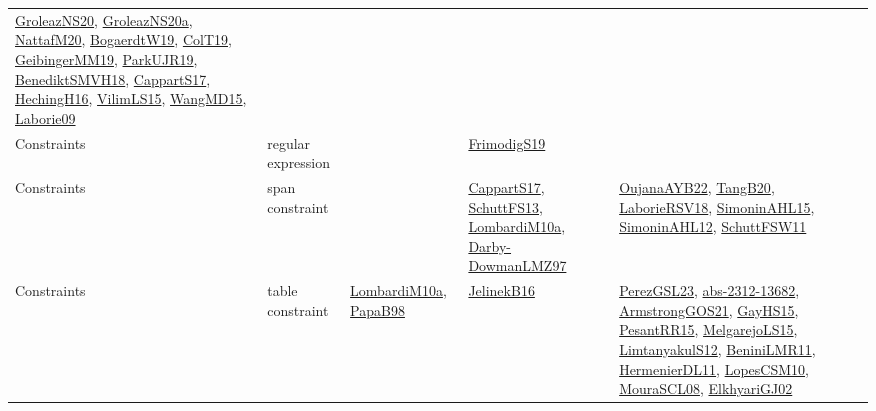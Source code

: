 {\begin{longtable}{lp{3cm}>{\raggedright}p{6cm}>{\raggedright}p{6cm}p{8cm}}
\href{papers/GroleazNS20.pdf}{GroleazNS20}\cite{GroleazNS20}, \href{papers/GroleazNS20a.pdf}{GroleazNS20a}\cite{GroleazNS20a}, \href{papers/NattafM20.pdf}{NattafM20}\cite{NattafM20}, \href{papers/BogaerdtW19.pdf}{BogaerdtW19}\cite{BogaerdtW19}, \href{papers/ColT19.pdf}{ColT19}\cite{ColT19}, \href{papers/GeibingerMM19.pdf}{GeibingerMM19}\cite{GeibingerMM19}, \href{papers/ParkUJR19.pdf}{ParkUJR19}\cite{ParkUJR19}, \href{papers/BenediktSMVH18.pdf}{BenediktSMVH18}\cite{BenediktSMVH18}, \href{papers/CappartS17.pdf}{CappartS17}\cite{CappartS17}, \href{papers/HechingH16.pdf}{HechingH16}\cite{HechingH16}, \href{papers/VilimLS15.pdf}{VilimLS15}\cite{VilimLS15}, \href{articles/WangMD15.pdf}{WangMD15}\cite{WangMD15}, \href{papers/Laborie09.pdf}{Laborie09}\cite{Laborie09}\\
Constraints & regular expression &  & \href{papers/FrimodigS19.pdf}{FrimodigS19}\cite{FrimodigS19} & \\
Constraints & span constraint &  & \href{papers/CappartS17.pdf}{CappartS17}\cite{CappartS17}, \href{papers/SchuttFS13.pdf}{SchuttFS13}\cite{SchuttFS13}, \href{articles/LombardiM10a.pdf}{LombardiM10a}\cite{LombardiM10a}, \href{articles/Darby-DowmanLMZ97.pdf}{Darby-DowmanLMZ97}\cite{Darby-DowmanLMZ97} & \href{papers/OujanaAYB22.pdf}{OujanaAYB22}\cite{OujanaAYB22}, \href{papers/TangB20.pdf}{TangB20}\cite{TangB20}, \href{articles/LaborieRSV18.pdf}{LaborieRSV18}\cite{LaborieRSV18}, \href{articles/SimoninAHL15.pdf}{SimoninAHL15}\cite{SimoninAHL15}, \href{papers/SimoninAHL12.pdf}{SimoninAHL12}\cite{SimoninAHL12}, \href{articles/SchuttFSW11.pdf}{SchuttFSW11}\cite{SchuttFSW11}\\
Constraints & table constraint & \href{articles/LombardiM10a.pdf}{LombardiM10a}\cite{LombardiM10a}, \href{articles/PapaB98.pdf}{PapaB98}\cite{PapaB98} & \href{papers/JelinekB16.pdf}{JelinekB16}\cite{JelinekB16} & \href{papers/PerezGSL23.pdf}{PerezGSL23}\cite{PerezGSL23}, \href{articles/abs-2312-13682.pdf}{abs-2312-13682}\cite{abs-2312-13682}, \href{papers/ArmstrongGOS21.pdf}{ArmstrongGOS21}\cite{ArmstrongGOS21}, \href{papers/GayHS15.pdf}{GayHS15}\cite{GayHS15}, \href{papers/PesantRR15.pdf}{PesantRR15}\cite{PesantRR15}, \href{papers/MelgarejoLS15.pdf}{MelgarejoLS15}\cite{MelgarejoLS15}, \href{articles/LimtanyakulS12.pdf}{LimtanyakulS12}\cite{LimtanyakulS12}, \href{articles/BeniniLMR11.pdf}{BeniniLMR11}\cite{BeniniLMR11}, \href{papers/HermenierDL11.pdf}{HermenierDL11}\cite{HermenierDL11}, \href{articles/LopesCSM10.pdf}{LopesCSM10}\cite{LopesCSM10}, \href{papers/MouraSCL08.pdf}{MouraSCL08}\cite{MouraSCL08}, \href{papers/ElkhyariGJ02.pdf}{ElkhyariGJ02}\cite{ElkhyariGJ02}\\

\end{longtable}}
